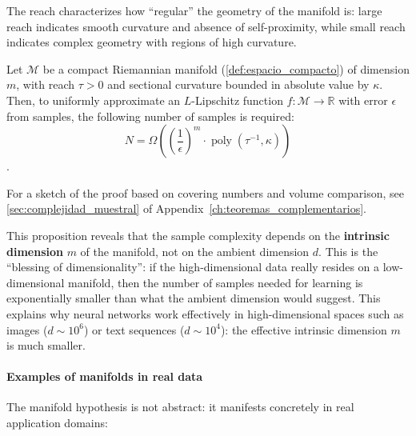 The reach characterizes how ``regular'' the geometry of the manifold is: large reach indicates smooth curvature and absence of self-proximity, while small reach indicates complex geometry with regions of high curvature.

\begin{proposition}\label{prop:complejidad_muestral_variedades}
Let $\mathcal{M}$ be a compact Riemannian manifold (\autoref{def:espacio_compacto}) of dimension $m$, with reach $\tau > 0$ and sectional curvature bounded in absolute value by $\kappa$. Then, to uniformly approximate an $L$-Lipschitz function $f: \mathcal{M} \to \mathbb{R}$ with error $\epsilon$ from samples, the following number of samples is required:
\[
N = \Omega\left(\left(\frac{1}{\epsilon}\right)^m \cdot \operatorname{poly}(\tau^{-1}, \kappa)\right)
\]
\citep{niyogi2008finding}.
\end{proposition}

For a sketch of the proof based on covering numbers and volume comparison, see \autoref{sec:complejidad_muestral} of Appendix~\ref{ch:teoremas_complementarios}.

This proposition reveals that the sample complexity depends on the \textbf{intrinsic dimension} $m$ of the manifold, not on the ambient dimension $d$. This is the ``blessing of dimensionality'': if the high-dimensional data really resides on a low-dimensional manifold, then the number of samples needed for learning is exponentially smaller than what the ambient dimension would suggest. This explains why neural networks work effectively in high-dimensional spaces such as images ($d \sim 10^6$) or text sequences ($d \sim 10^4$): the effective intrinsic dimension $m$ is much smaller.

\paragraph{Examples of manifolds in real data}

The manifold hypothesis is not abstract: it manifests concretely in real application domains:

